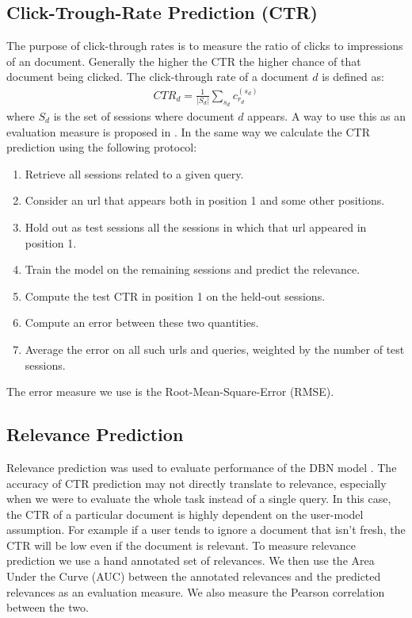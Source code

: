 \subsection{Click-Trough-Rate Prediction (CTR)}
\label{sec:ctr}
The purpose of click-through rates is to measure the ratio of clicks to impressions of an document.
Generally the higher the CTR the higher chance of that document being clicked.
The click-through rate of a document $d$ is defined as:
\begin{align}
	CTR_d = \frac{1}{|S_d|} \sum_{s_d} c_{r_d}^{(s_d)}
\end{align}
where $S_d$ is the set of sessions where document $d$ appears.
A way to use this as an evaluation measure is proposed in \cite[p. 4]{Chapelle2009}. In the same way we calculate the CTR prediction using the following protocol:
\begin{enumerate}
	\item Retrieve all sessions related to a given query.
	\item Consider an url that appears both in position 1 and some other positions.
	\item Hold out as test sessions all the sessions in which that url appeared in position 1.
	\item Train the model on the remaining sessions and predict the relevance.
	\item Compute the test CTR in position 1 on the held-out sessions.
	\item Compute an error between these two quantities.
	\item Average the error on all such urls and queries, weighted by the number of test sessions.
\end{enumerate}

The error measure we use is the Root-Mean-Square-Error (RMSE).

\subsection{Relevance Prediction}
Relevance prediction was used to evaluate performance of the DBN model \cite[p. 6]{Chapelle2009}.
The accuracy of CTR prediction may not directly translate to relevance, especially when we were to evaluate the whole task instead of a single query.
In this case, the CTR of a particular document is highly dependent on the user-model assumption.
For example if a user tends to ignore a document that isn't fresh, the CTR will be low even if the document is relevant.
To measure relevance prediction we use a hand annotated set of relevances. We then use the Area Under the Curve (AUC) between the annotated relevances and the predicted relevances as an evaluation measure. We also measure the Pearson correlation between the two. 

